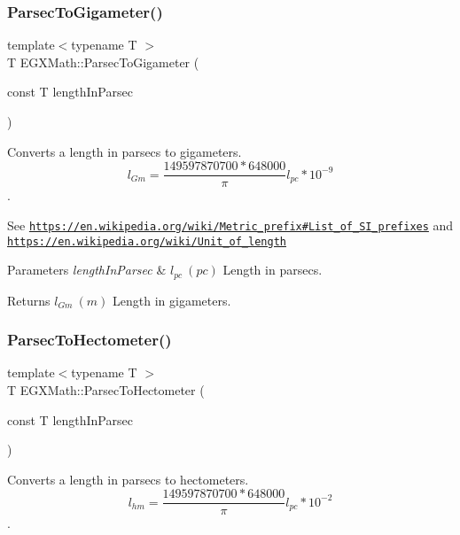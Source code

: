 \subsubsection{\texorpdfstring{Parsec\+To\+Gigameter()}{ParsecToGigameter()}}
{\footnotesize\ttfamily template$<$typename T $>$ \\
T E\+G\+X\+Math\+::\+Parsec\+To\+Gigameter (\begin{DoxyParamCaption}\item[{const T}]{length\+In\+Parsec }\end{DoxyParamCaption})}



Converts a length in parsecs to gigameters. \[ l_{Gm}=\frac{149597870700 * 648000}{\pi}l_{pc} * 10^{-9} \]. 

See \href{https://en.wikipedia.org/wiki/Metric_prefix#List_of_SI_prefixes}{\tt https\+://en.\+wikipedia.\+org/wiki/\+Metric\+\_\+prefix\#\+List\+\_\+of\+\_\+\+S\+I\+\_\+prefixes} and \href{https://en.wikipedia.org/wiki/Unit_of_length}{\tt https\+://en.\+wikipedia.\+org/wiki/\+Unit\+\_\+of\+\_\+length} 
\begin{DoxyParams}{Parameters}
{\em length\+In\+Parsec} & $ l_{pc}\ (pc)$ Length in parsecs. \\
\hline
\end{DoxyParams}
\begin{DoxyReturn}{Returns}
$ l_{Gm}\ (m)$ Length in gigameters. 
\end{DoxyReturn}
\mbox{\label{group___e_g_x_math-_conversions-_length_conversions-_astronomical-_parsec-_s_i_ga8abf21ebe80987ba6668d54e90d46129}} 
\subsubsection{\texorpdfstring{Parsec\+To\+Hectometer()}{ParsecToHectometer()}}
{\footnotesize\ttfamily template$<$typename T $>$ \\
T E\+G\+X\+Math\+::\+Parsec\+To\+Hectometer (\begin{DoxyParamCaption}\item[{const T}]{length\+In\+Parsec }\end{DoxyParamCaption})}



Converts a length in parsecs to hectometers. \[ l_{hm}=\frac{149597870700 * 648000}{\pi}l_{pc} * 10^{-2} \]. 

